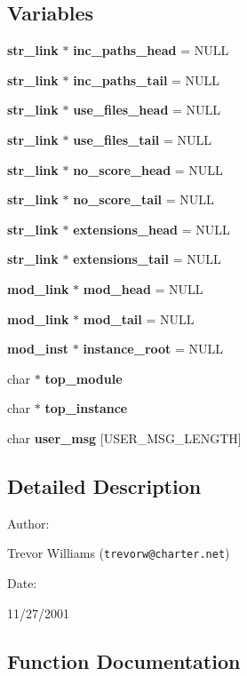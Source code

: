 \subsection*{Variables}
\begin{CompactItemize}
\item 
{\bf str\_\-link} $\ast$ {\bf inc\_\-paths\_\-head} = NULL
\item 
{\bf str\_\-link} $\ast$ {\bf inc\_\-paths\_\-tail} = NULL
\item 
{\bf str\_\-link} $\ast$ {\bf use\_\-files\_\-head} = NULL
\item 
{\bf str\_\-link} $\ast$ {\bf use\_\-files\_\-tail} = NULL
\item 
{\bf str\_\-link} $\ast$ {\bf no\_\-score\_\-head} = NULL
\item 
{\bf str\_\-link} $\ast$ {\bf no\_\-score\_\-tail} = NULL
\item 
{\bf str\_\-link} $\ast$ {\bf extensions\_\-head} = NULL
\item 
{\bf str\_\-link} $\ast$ {\bf extensions\_\-tail} = NULL
\item 
{\bf mod\_\-link} $\ast$ {\bf mod\_\-head} = NULL
\item 
{\bf mod\_\-link} $\ast$ {\bf mod\_\-tail} = NULL
\item 
{\bf mod\_\-inst} $\ast$ {\bf instance\_\-root} = NULL
\item 
char $\ast$ {\bf top\_\-module}
\item 
char $\ast$ {\bf top\_\-instance}
\item 
char {\bf user\_\-msg} [USER\_\-MSG\_\-LENGTH]
\end{CompactItemize}


\subsection{Detailed Description}


\begin{Desc}
\item[Author: ]\par
Trevor Williams ({\tt trevorw@charter.net}) \end{Desc}
\begin{Desc}
\item[Date: ]\par
11/27/2001\end{Desc}


\subsection{Function Documentation}
